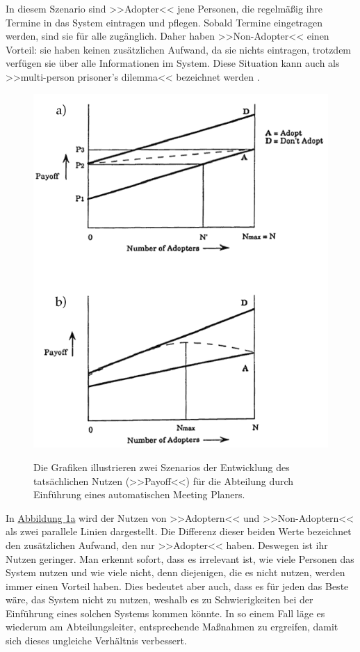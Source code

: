 	In diesem Szenario sind >>Adopter<< jene Personen, die regelmäßig ihre Termine in das System eintragen und pflegen. Sobald Termine eingetragen werden, sind sie für alle zugänglich. Daher haben >>Non-Adopter<< einen Vorteil: sie haben keinen zusätzlichen Aufwand, da sie nichts eintragen, trotzdem verfügen sie über alle Informationen im System. Diese Situation kann auch als >>multi-person prisoner's dilemma<< bezeichnet werden \citep{Schelling:1987}.

\begin{figure}
	{\includegraphics[width=1\linewidth]{gfx/markusMeetingPlanner}}
\caption[>>Payoff<< durch Nutzung eines automatischen Meeting Planers \newline \citep{Markus:1990}]{Die Grafiken illustrieren zwei Szenarios der Entwicklung des tatsächlichen Nutzen (>>Payoff<<) für die Abteilung durch Einführung eines automatischen Meeting Planers.}\label{fig:markusMeeting}
\end{figure}

In \hyperref[fig:markusMeeting]{Abbildung \ref*{fig:markusMeeting}a} wird der Nutzen von >>Adoptern<< und >>Non-Adoptern<< als zwei parallele Linien dargestellt. Die Differenz dieser beiden Werte bezeichnet den zusätzlichen Aufwand, den nur >>Adopter<< haben. Deswegen ist ihr Nutzen geringer. Man erkennt sofort, dass es irrelevant ist, wie viele Personen das System nutzen und wie viele nicht, denn diejenigen, die es nicht nutzen, werden immer einen Vorteil haben. Dies bedeutet aber auch, dass es für jeden das Beste wäre, das System nicht zu nutzen, weshalb es zu Schwierigkeiten bei der Einführung eines solchen Systems kommen könnte. In so einem Fall läge es wiederum am Abteilungsleiter, entsprechende Maßnahmen zu ergreifen, damit sich dieses ungleiche Verhältnis verbessert. 

